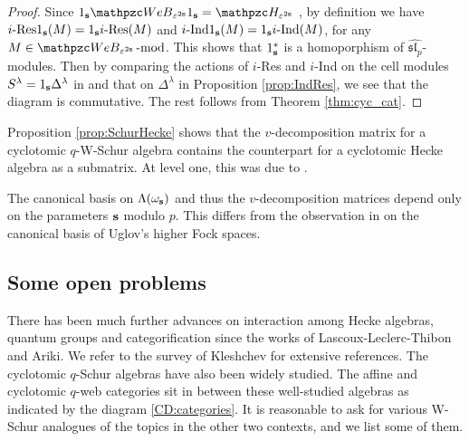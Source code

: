 \begin{proof}
Since $1_\bfs \qW_{\eps^{2\bfs}} 1_\bfs= \HH_{\eps^{2\bfs}}$ \cite{SSW25}, 
  by definition we have  
  $i\text{-Res}1_{\mathbf{s}} (M)= 1_{\mathbf{s}} i\text{-Res}(M)$ and $i\text{-Ind}1_{\mathbf{s}} (M)= 1_{\mathbf{s}} i\text{-Ind}(M)$, for any $M\in \qW_{\eps^{2\bfs}} \modf$.
  This shows that $1_{\mathbf{s}}^*$ is a homoporphism of $\widehat{\mathfrak{sl}_p}$-modules. 
  Then by comparing the actions of $i$-Res and $i$-Ind on the cell modules $ S^{\lambda}=1_{\mathbf{s}} \Delta^\lambda$ in \cite[Lemma 2.1]{Ar96} and that on $\Delta^\lambda $ in Proposition \ref{prop:IndRes}, we see that  the diagram is commutative. The rest follows from Theorem \ref{thm:cyc_cat}.
\end{proof}

\begin{rem}
Proposition \ref{prop:SchurHecke} shows  that the $v$-decomposition matrix for a cyclotomic $q$-W-Schur algebra contains the counterpart for a cyclotomic Hecke algebra as a submatrix. At level one, this was due to \cite{LT96, VV99}. 
\end{rem}

\begin{rem}
The canonical basis on $\Lambda(\omega_{\mathbf{s}})$ and thus the $v$-decomposition matrices depend only on the parameters $\mathbf{s}$ modulo $p$. This differs from the observation in \cite{Yv06} on the canonical basis of Uglov's higher Fock spaces.
\end{rem}


\subsection{Some open problems}
\label{ssec:open}

There has been much further advances on interaction among Hecke algebras, quantum groups and categorification since the works of Lascoux-Leclerc-Thibon and Ariki. We refer to the survey of Kleshchev \cite{Kle10} for extensive references. The cyclotomic $q$-Schur algebras have also been widely studied. The affine and cyclotomic $q$-web categories sit in between these well-studied algebras as indicated by the diagram \eqref{CD:categories}. It is reasonable to ask for various W-Schur analogues of the topics in the other two contexts, and we list some of them.

